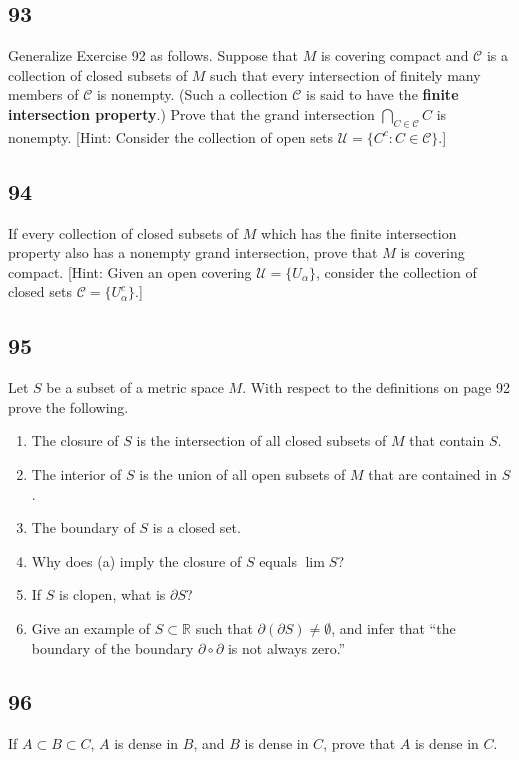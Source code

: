 \documentclass{amsart}
\begin{document}
\subsection*{93}
Generalize Exercise 92 as follows. Suppose that $M$ is covering compact and $\mathcal{C}$ is a collection of closed subsets of $M$ such that every intersection of finitely many members of $\mathcal{C}$ is nonempty. (Such a collection $\mathcal{C}$ is said to have the \textbf{finite intersection property}.) Prove that the grand intersection $\bigcap_{C \in \mathcal{C}} C$ is nonempty. [Hint: Consider the collection of open sets $\mathcal{U} = \{C^c : C \in \mathcal{C}\}$.]

\subsection*{94}
If every collection of closed subsets of $M$ which has the finite intersection property also has a nonempty grand intersection, prove that $M$ is covering compact. [Hint: Given an open covering $\mathcal{U} = \{U_\alpha\}$, consider the collection of closed sets $\mathcal{C} = \{U_\alpha^c\}$.]

\subsection*{95}
Let $S$ be a subset of a metric space $M$. With respect to the definitions on page 92 prove the following.
\begin{enumerate}[label=(\alph*)]
\item The closure of $S$ is the intersection of all closed subsets of $M$ that contain $S$.
\item The interior of $S$ is the union of all open subsets of $M$ that are contained in $S$.
\item The boundary of $S$ is a closed set.
\item Why does (a) imply the closure of $S$ equals $\lim S$?
\item If $S$ is clopen, what is $\partial S$?
\item Give an example of $S \subset \mathbb{R}$ such that $\partial(\partial S) \ne \emptyset$, and infer that ``the boundary of the boundary $\partial \circ \partial$ is not always zero.''
\end{enumerate}

\subsection*{96}
If $A \subset B \subset C$, $A$ is dense in $B$, and $B$ is dense in $C$, prove that $A$ is dense in $C$.
\end{document}

